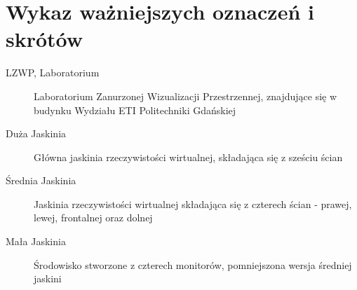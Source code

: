 \chapter*{Wykaz ważniejszych oznaczeń i skrótów}

\begin{description}
	\item [LZWP, Laboratorium] Laboratorium Zanurzonej Wizualizacji Przestrzennej, znajdujące się w budynku Wydziału ETI Politechniki Gdańskiej
	\item [Duża Jaskinia] Główna jaskinia rzeczywistości wirtualnej, składająca się z sześciu ścian
	\item [Średnia Jaskinia] Jaskinia rzeczywistości wirtualnej składająca się z czterech ścian - prawej, lewej, frontalnej oraz dolnej
	\item [Mała Jaskinia] Środowisko stworzone z czterech monitorów, pomniejszona wersja średniej jaskini
\end{description}
